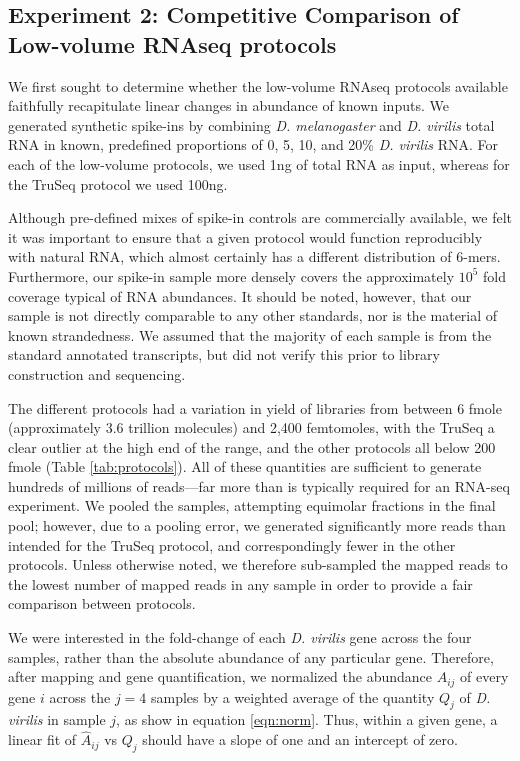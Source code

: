 \subsection{Experiment 2: Competitive Comparison of Low-volume RNAseq protocols}

We first sought to determine whether the low-volume RNAseq protocols available faithfully recapitulate linear changes in abundance of known inputs. We generated synthetic spike-ins by combining {\em D. melanogaster} and {\em D. virilis} total RNA in known, predefined proportions of 0, 5, 10, and 20\% {\em D. virilis} RNA. For each of the low-volume protocols, we used 1ng of total RNA as input, whereas for the TruSeq protocol we used 100ng.

Although pre-defined mixes of spike-in controls are commercially available, we felt it was important to ensure that a given protocol would function reproducibly with natural RNA, which almost certainly has a different distribution of 6-mers. Furthermore, our spike-in sample more densely covers the approximately $10^5$ fold coverage typical of RNA abundances.  It should be noted, however, that our sample is not directly comparable to any other standards, nor is the material of known strandedness.  We assumed that the majority of each sample is from the standard annotated transcripts, but did not verify this prior to library construction and sequencing.

The different protocols had a variation in yield of libraries from between 6 fmole (approximately 3.6 trillion molecules) and 2,400 femtomoles, with the TruSeq a clear outlier at the high end of the range, and the other protocols all below 200 fmole (Table \ref{tab:protocols}).  All of these quantities are sufficient to generate hundreds of millions of reads---far more than is typically required for an RNA-seq experiment. We pooled the samples, attempting equimolar fractions in the final pool; however, due to a pooling error, we generated significantly more reads than intended for the TruSeq protocol, and correspondingly fewer in the other protocols. Unless otherwise noted, we therefore sub-sampled the mapped reads to the lowest number of mapped reads in any sample in order to provide a fair comparison between protocols. 

We were interested in the fold-change of each {\em D. virilis} gene across the four samples, rather than the absolute abundance of any particular gene. Therefore, after mapping and gene quantification, we normalized the abundance $A_{ij}$ of every gene $i$ across the $j=4$ samples by a weighted average of the quantity $Q_j$ of {\em D. virilis} in sample $j$, as show in equation \ref{eqn:norm}.  Thus, within a given gene, a linear fit of $\hat{A}_{ij}$ vs $Q_j$ should have a slope of one and an intercept of zero.

